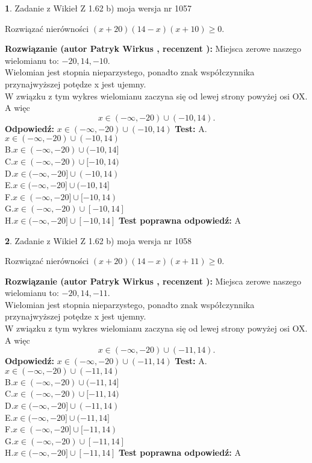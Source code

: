 \documentclass[12pt, a4paper]{article}
\theoremstyle{definition} %
\newtheorem{zad}{}
\newcommand{\zadStart}[1]{\begin{zad}#1\newline}
\newcommand{\zadStop}{\end{zad}}
\newcommand{\rozwStart}[2]{\noindent \textbf{Rozwiązanie (autor #1 , recenzent #2): }\newline}
\newcommand{\rozwStop}{\newline}
\newcommand{\odpStart}{\noindent \textbf{Odpowiedź:}\newline}
\newcommand{\odpStop}{\newline}
\newcommand{\testStart}{\noindent \textbf{Test:}\newline}
\newcommand{\testStop}{\newline}
\newcommand{\kluczStart}{\noindent \textbf{Test poprawna odpowiedź:}\newline}
\newcommand{\kluczStop}{\newline}
\begin{document}
\zadStart{Zadanie z Wikieł Z 1.62 b) moja wersja nr 1057}

Rozwiązać nierówności $(x+20)(14-x)(x+10)\ge0$.
\zadStop
\rozwStart{Patryk Wirkus}{}
Miejsca zerowe naszego wielomianu to: $-20, 14, -10$.\\
Wielomian jest stopnia nieparzystego, ponadto znak współczynnika przy\linebreak najwyższej potędze x jest ujemny.\\ W związku z tym wykres wielomianu zaczyna się od lewej strony powyżej osi OX. A więc $$x \in (-\infty,-20) \cup (-10,14).$$
\rozwStop
\odpStart
$x \in (-\infty,-20) \cup (-10,14)$
\odpStop
\testStart
A.$x \in (-\infty,-20) \cup (-10,14)$\\
B.$x \in (-\infty,-20) \cup (-10,14]$\\
C.$x \in (-\infty,-20) \cup [-10,14)$\\
D.$x \in (-\infty,-20] \cup (-10,14)$\\
E.$x \in (-\infty,-20] \cup (-10,14]$\\
F.$x \in (-\infty,-20] \cup [-10,14)$\\
G.$x \in (-\infty,-20) \cup [-10,14]$\\
H.$x \in (-\infty,-20] \cup [-10,14]$
\testStop
\kluczStart
A
\kluczStop



\zadStart{Zadanie z Wikieł Z 1.62 b) moja wersja nr 1058}

Rozwiązać nierówności $(x+20)(14-x)(x+11)\ge0$.
\zadStop
\rozwStart{Patryk Wirkus}{}
Miejsca zerowe naszego wielomianu to: $-20, 14, -11$.\\
Wielomian jest stopnia nieparzystego, ponadto znak współczynnika przy\linebreak najwyższej potędze x jest ujemny.\\ W związku z tym wykres wielomianu zaczyna się od lewej strony powyżej osi OX. A więc $$x \in (-\infty,-20) \cup (-11,14).$$
\rozwStop
\odpStart
$x \in (-\infty,-20) \cup (-11,14)$
\odpStop
\testStart
A.$x \in (-\infty,-20) \cup (-11,14)$\\
B.$x \in (-\infty,-20) \cup (-11,14]$\\
C.$x \in (-\infty,-20) \cup [-11,14)$\\
D.$x \in (-\infty,-20] \cup (-11,14)$\\
E.$x \in (-\infty,-20] \cup (-11,14]$\\
F.$x \in (-\infty,-20] \cup [-11,14)$\\
G.$x \in (-\infty,-20) \cup [-11,14]$\\
H.$x \in (-\infty,-20] \cup [-11,14]$
\testStop
\kluczStart
A
\kluczStop
\end{document}
